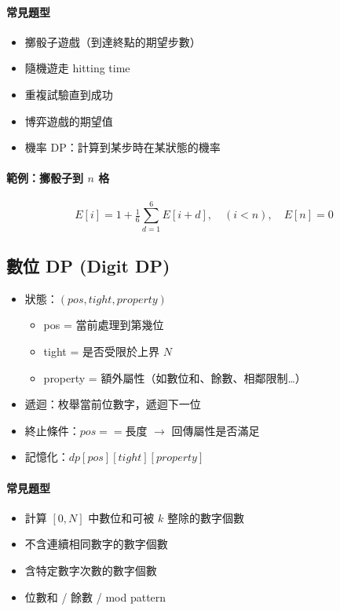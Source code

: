 \documentclass[a4paper,10pt,twocolumn,oneside]{article}
\begin{document}
\paragraph{常見題型}
\begin{itemize}[nolistsep]
    \item 擲骰子遊戲（到達終點的期望步數）
    \item 隨機遊走 hitting time
    \item 重複試驗直到成功
    \item 博弈遊戲的期望值
    \item 機率 DP：計算到某步時在某狀態的機率
\end{itemize}

\paragraph{範例：擲骰子到 $n$ 格}
\[
    E[i] = 1 + \tfrac{1}{6}\sum_{d=1}^6 E[i+d], \quad (i<n), 
    \quad E[n] = 0
\]



\subsection{數位 DP (Digit DP)}

\begin{itemize}[nolistsep]
    \item 狀態：$(pos, tight, property)$
    \begin{itemize}[nolistsep]
        \item pos = 當前處理到第幾位
        \item tight = 是否受限於上界 $N$
        \item property = 額外屬性（如數位和、餘數、相鄰限制…）
    \end{itemize}
    \item 遞迴：枚舉當前位數字，遞迴下一位
    \item 終止條件：$pos == \text{長度}$ $\to$ 回傳屬性是否滿足
    \item 記憶化：$dp[pos][tight][property]$
\end{itemize}

\paragraph{常見題型}
\begin{itemize}[nolistsep]
    \item 計算 $[0,N]$ 中數位和可被 $k$ 整除的數字個數
    \item 不含連續相同數字的數字個數
    \item 含特定數字次數的數字個數
    \item 位數和 / 餘數 / mod pattern
\end{itemize}
\end{document}
